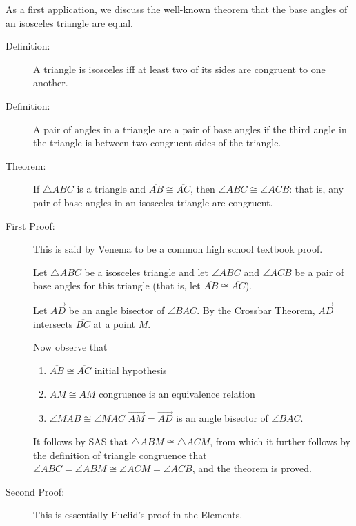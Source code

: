 \documentclass[12pt]{article}
\begin{document}
As a first application, we discuss the well-known theorem that the base angles of an isosceles triangle are equal.

\begin{description}


\item[Definition:]  A triangle is isosceles iff at least two of its sides are congruent to one another.

\item[Definition:]  A pair of angles in a triangle are a pair of base angles  if the third angle in the triangle is between two congruent sides of the triangle.

\item[Theorem:]  If $\triangle ABC$ is a triangle and $\overline{AB} \cong \overline{AC}$, then $\angle ABC \cong \angle ACB$:  that is, any pair of base angles in an isosceles triangle are congruent.

\item[First Proof:]  This is said by Venema to be a common high school textbook proof.

Let $\triangle ABC$ be a isosceles triangle and let $\angle ABC$ and $\angle ACB$ be a pair of base angles for this triangle (that is, let $\overline {AB} \cong \overline {AC}$).

Let $\overrightarrow{AD}$ be an angle bisector of $\angle BAC$.  By the Crossbar Theorem, $\overrightarrow {AD}$ intersects $\overline{BC}$ at a point $M$.

Now observe that

\begin{enumerate}

\item $\overline{AB} \cong \overline{AC}$ initial hypothesis

\item $\overline {AM} \cong \overline{AM}$ congruence is an equivalence relation

\item $\angle MAB \cong \angle MAC$ $\overrightarrow{AM} = \overrightarrow{AD}$ is an angle bisector of $\angle BAC$.


\end{enumerate}

It follows by SAS that $\triangle ABM \cong \triangle ACM$, from which it further follows by the definition of triangle congruence that $\angle  ABC = \angle ABM \cong \angle ACM = \angle ACB$, and the theorem is proved.

\item[Second Proof:]  This is essentially  Euclid's proof in the Elements.


\end{description}
\end{document}

